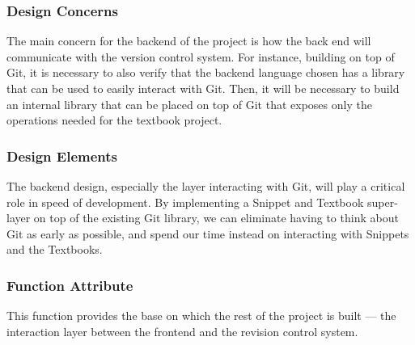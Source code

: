 \documentclass[onecolumn, draftclsnofoot,10pt, compsoc]{IEEEtran}
\begin{document}
\subsubsection{Design Concerns}
\noindent The main concern for the backend of the project is how the back end 
will communicate with the version control system. For instance, building on 
top of Git, it is necessary to also verify that the backend language chosen 
has a library that can be used to easily interact with Git. Then, it will be 
necessary to build an internal library that can be placed on top of Git that 
exposes only the operations needed for the textbook project. \\

\subsubsection{Design Elements}
\noindent The backend design, especially the layer interacting with Git, will 
play a critical role in speed of development. By implementing a Snippet and 
Textbook super-layer on top of the existing Git library, we can eliminate 
having to think about Git as early as possible, and spend our time instead on 
interacting with Snippets and the Textbooks.\\

\subsubsection{Function Attribute}
\noindent This function provides the base on which the rest of the project is
built — the interaction layer between the frontend and the revision control 
system.


\newpage
\end{document}

